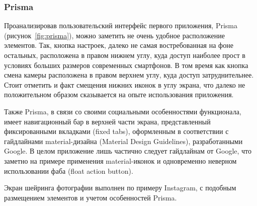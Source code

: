\subsubsection{Prisma}

Проанализировав пользовательский интерфейс первого приложения, Prisma (рисунок~\ref{fig:prisma}), можно заметить не очень удобное расположение элементов. Так, кнопка настроек, далеко не самая востребованная на фоне остальных, расположена в правом нижнем углу, куда доступ наиболее прост в условиях больших размеров современных смартфонов. В том время как кнопка смена камеры расположена в правом верхнем углу, куда доступ затруднительнее. Стоит отметить и факт смещения нижних иконок в углу экрана, что далеко не положительном образом сказывается на опыте использования приложения.

Также Prisma, в связи со своими социальными особенностями функционала, имеет навигационный бар в верхней части экрана, представленный фиксированными вкладками (fixed tabs), оформленным в соответствии с гайдлайнами material-дизайна (Material Design Guidelines), разработанными Google. В целом приложение лишь частично следует гайдлайнам от Google, что заметно на примере применения material-иконок и одновременно неверном использовании фаба (float action button).

Экран шейринга фотографии выполнен по примеру Instagram, с подобным размещением элементов и учетом особенностей Prisma.

